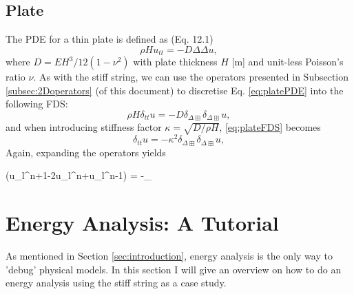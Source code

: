 \documentclass{article}
\begin{document}
\subsection{Plate}
The PDE for a thin plate is defined as (Eq. 12.1)
\begin{equation}\label{eq:platePDE}
    \rho H u_{tt} = -D\Delta\Delta u,
\end{equation}
where $D = EH^3/12(1-\nu^2)$ with plate thickness $H$ [m] and unit-less Poisson's ratio $\nu$. As with the stiff string, we can use the operators presented in Subsection \ref{subsec:2Doperators} (of this document) to discretise Eq. \eqref{eq:platePDE} into the following FDS: 
\begin{equation}\label{eq:plateFDS}
    \rho H \delta_{tt}u = -D\delta_{\Delta\boxplus}\delta_{\Delta\boxplus} u,
\end{equation}
and when introducing stiffness factor $\kappa =\sqrt{D/\rho H}$, \eqref{eq:plateFDS} becomes
\begin{equation}\label{eq:plateFDS}
    \delta_{tt}u = -\kappa^2\delta_{\Delta\boxplus}\delta_{\Delta\boxplus} u,
\end{equation}
Again, expanding the operators yields

(u_l^{n+1}-2u_l^n+u_l^{n-1}) = -\delta_{\Delta\boxplus}


\section{Energy Analysis: A Tutorial}\label{sec:energy}
As mentioned in Section \ref{sec:introduction}, energy analysis is the only way to 'debug' physical models. In this section I will give an overview on how to do an energy analysis using the stiff string as a case study. 
\end{document}
